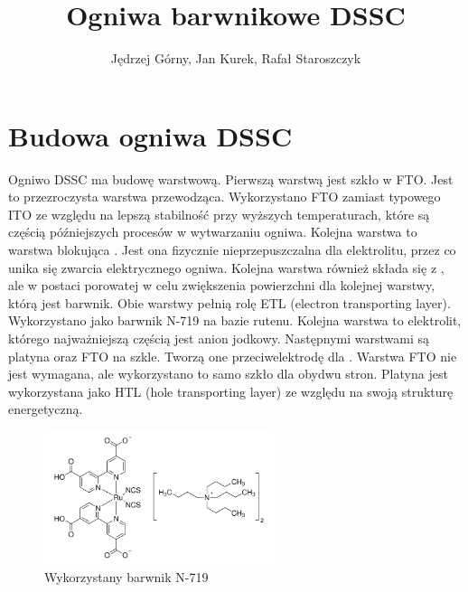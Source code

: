 \documentclass[a4, 12pt]{article}
\title{Ogniwa barwnikowe DSSC}
\author{Jędrzej Górny, Jan Kurek, Rafał Staroszczyk}
\date{}
\begin{document}
	\maketitle
	\section{Budowa ogniwa DSSC}
	Ogniwo DSSC ma budowę warstwową. Pierwszą warstwą jest szkło w FTO. Jest to przezroczysta warstwa przewodząca. Wykorzystano FTO zamiast typowego ITO ze względu na lepszą stabilność przy wyższych temperaturach, które są częścią późniejszych procesów w wytwarzaniu ogniwa. Kolejna warstwa to warstwa blokująca . Jest ona fizycznie nieprzepuszczalna dla elektrolitu, przez co unika się zwarcia elektrycznego ogniwa. Kolejna warstwa również składa się z , ale w postaci porowatej w celu zwiększenia powierzchni dla kolejnej warstwy, którą jest barwnik. Obie warstwy  pełnią rolę ETL (electron transporting layer). Wykorzystano jako barwnik N-719 na bazie rutenu. Kolejna warstwa to elektrolit, którego najważniejszą częścią jest anion jodkowy. Następnymi warstwami są platyna oraz FTO na szkle. Tworzą one przeciwelektrodę dla . Warstwa FTO nie jest wymagana, ale wykorzystano to samo szkło dla obydwu stron. Platyna jest wykorzystana jako HTL (hole transporting layer) ze względu na swoją strukturę energetyczną. 
	\begin{figure}[H]
		\centering
		\includegraphics[width=0.6\textwidth]{n719.png}
		\caption{Wykorzystany barwnik N-719}
	\end{figure}
	
\end{document}
